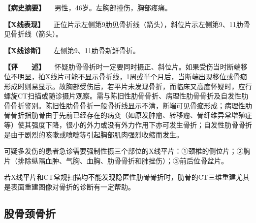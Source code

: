 \textbf{【病史摘要】} 　男性，46岁。左胸部撞伤，胸部疼痛。

\textbf{【X线表现】}
　正位片示左侧第9肋见骨折线（箭头），斜位片示左侧第9、11肋骨见骨折线（箭头）。

\textbf{【X线诊断】} 　左侧第9、11肋骨新鲜骨折。

\textbf{【评　　述】}
　怀疑肋骨骨折时一定要同时摄正、斜位片。如果受伤当时断端移位不明显，拍X线片可能不显示骨折线，1周或半个月后，当断端出现移位或骨痂形成时则易显示。故胸部受伤后，若平片未发现骨折，而临床又高度怀疑时，应行螺旋CT扫描或随诊摄片观察。需与陈旧性肋骨骨折、病理性肋骨骨折及自发性肋骨骨折鉴别。陈旧性肋骨骨折一般骨折线显示不清，断端可见骨痂形成；病理性肋骨骨折指肋骨由于先前已经存在的病变（如原发肿瘤、转移瘤、骨纤维异常增殖症等）使其强度下降，很小的外力或没有外力作用下亦可发生骨折；自发性肋骨骨折是由于剧烈的咳嗽或喷嚏等引起胸部肌肉强烈收缩而发生。

可疑多发伤的患者急诊需要强制性摄三个部位的X线平片：①颈椎的侧位片；②胸片（排除纵隔血肿、气胸、血胸、肋骨骨折和肺挫伤）；③前后位骨盆片。

若X线平片和CT常规扫描均不能发现隐匿性肋骨骨折时，肋骨的CT三维重建尤其是表面重建图像对骨折的诊断有一定帮助。

\subsection{股骨颈骨折}

